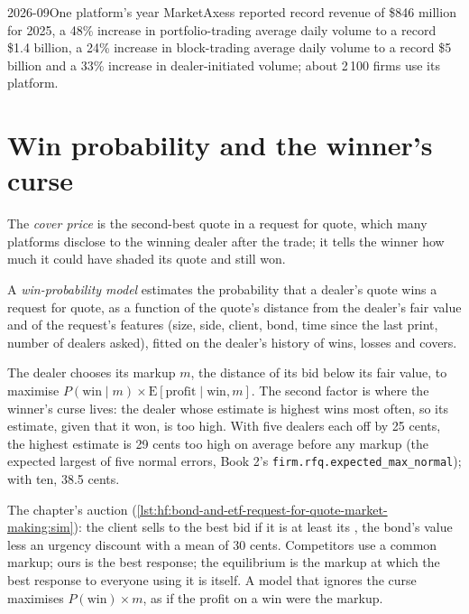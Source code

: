 \begin{dated}{2026-09}{One platform's year}\label{dat:hf:bond-and-etf-request-for-quote-market-making:mktx}
MarketAxess reported record revenue of \$846 million for 2025, a 48\% increase in portfolio-trading average daily volume to a record \$1.4 billion,
a 24\% increase in block-trading average daily volume to a record \$5 billion and a 33\% increase in dealer-initiated volume; about 2\,100 firms use
its platform.
\end{dated}

\section{Win probability and the winner's curse}

\begin{definition}\label{def:hf:bond-and-etf-request-for-quote-market-making:cover}
The \emph{cover price} is the second-best quote in a request for quote, which many platforms disclose to the winning dealer after
the trade; it tells the winner how much it could have shaded its quote and still won.
\end{definition}

\begin{definition}\label{def:hf:bond-and-etf-request-for-quote-market-making:win}
A \emph{win-probability model} estimates the probability that a dealer's quote wins a request for quote, as a function
of the quote's distance from the dealer's fair value and of the request's features (size, side, client, bond, time since the last print, number of
dealers asked), fitted on the dealer's history of wins, losses and covers.
\end{definition}

The dealer chooses its markup $m$, the distance of its bid below its fair value, to maximise $P(\text{win}\mid m)\times\mathrm{E}[\text{profit}\mid
\text{win},m]$. The second factor is where the winner's curse lives: the dealer whose estimate is highest wins most often, so its estimate, given that
it won, is too high. With five dealers each off by 25 cents, the highest estimate is 29 cents too high on average before any markup (the expected
largest of five normal errors, Book 2's \texttt{firm.rfq.expected\_max\_normal}); with ten, 38.5 cents.

The chapter's auction (\cref{lst:hf:bond-and-etf-request-for-quote-market-making:sim}): the client sells to the best bid if it is at least its
, the bond's value less an urgency discount with a mean of 30 cents. Competitors use a common markup; ours is the best response;
the equilibrium is the markup at which the best response to everyone using it is itself. A model that ignores the curse maximises $P(\text{win})\times m$,
as if the profit on a win were the markup.

